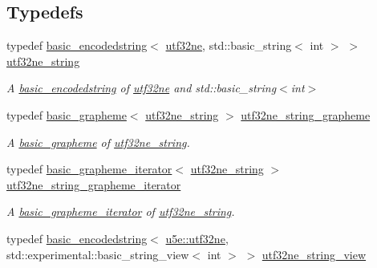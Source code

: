 \subsection*{Typedefs}
\begin{DoxyCompactItemize}
\item 
typedef \hyperlink{classu5e_1_1basic__encodedstring}{basic\+\_\+encodedstring}$<$ \hyperlink{classu5e_1_1utf32ne}{utf32ne}, std\+::basic\+\_\+string$<$ int $>$ $>$ \hyperlink{namespaceu5e_a141e060d3ece7c1ebc6950dd73e30d8a}{utf32ne\+\_\+string}\hypertarget{namespaceu5e_a141e060d3ece7c1ebc6950dd73e30d8a}{}\label{namespaceu5e_a141e060d3ece7c1ebc6950dd73e30d8a}

\begin{DoxyCompactList}\small\item\em A \hyperlink{classu5e_1_1basic__encodedstring}{basic\+\_\+encodedstring} of \hyperlink{classu5e_1_1utf32ne}{utf32ne} and std\+::basic\+\_\+string$<$int$>$ \end{DoxyCompactList}\item 
typedef \hyperlink{classu5e_1_1basic__grapheme}{basic\+\_\+grapheme}$<$ \hyperlink{classu5e_1_1utf32ne__string}{utf32ne\+\_\+string} $>$ \hyperlink{namespaceu5e_ac02b618a332250bdd04e7f406b1d62ca}{utf32ne\+\_\+string\+\_\+grapheme}\hypertarget{namespaceu5e_ac02b618a332250bdd04e7f406b1d62ca}{}\label{namespaceu5e_ac02b618a332250bdd04e7f406b1d62ca}

\begin{DoxyCompactList}\small\item\em A \hyperlink{classu5e_1_1basic__grapheme}{basic\+\_\+grapheme} of \hyperlink{classu5e_1_1utf32ne__string}{utf32ne\+\_\+string}. \end{DoxyCompactList}\item 
typedef \hyperlink{classu5e_1_1basic__grapheme__iterator}{basic\+\_\+grapheme\+\_\+iterator}$<$ \hyperlink{classu5e_1_1utf32ne__string}{utf32ne\+\_\+string} $>$ \hyperlink{namespaceu5e_aec6a21f39fe61b5f0188961809bb6eaa}{utf32ne\+\_\+string\+\_\+grapheme\+\_\+iterator}\hypertarget{namespaceu5e_aec6a21f39fe61b5f0188961809bb6eaa}{}\label{namespaceu5e_aec6a21f39fe61b5f0188961809bb6eaa}

\begin{DoxyCompactList}\small\item\em A \hyperlink{classu5e_1_1basic__grapheme__iterator}{basic\+\_\+grapheme\+\_\+iterator} of \hyperlink{classu5e_1_1utf32ne__string}{utf32ne\+\_\+string}. \end{DoxyCompactList}\item 
typedef \hyperlink{classu5e_1_1basic__encodedstring}{basic\+\_\+encodedstring}$<$ \hyperlink{classu5e_1_1utf32ne}{u5e\+::utf32ne}, std\+::experimental\+::basic\+\_\+string\+\_\+view$<$ int $>$ $>$ \hyperlink{namespaceu5e_a2fe53515f1f5ae975fb85538bab13351}{utf32ne\+\_\+string\+\_\+view}\hypertarget{namespaceu5e_a2fe53515f1f5ae975fb85538bab13351}{}\label{namespaceu5e_a2fe53515f1f5ae975fb85538bab13351}


\end{DoxyCompactItemize}
